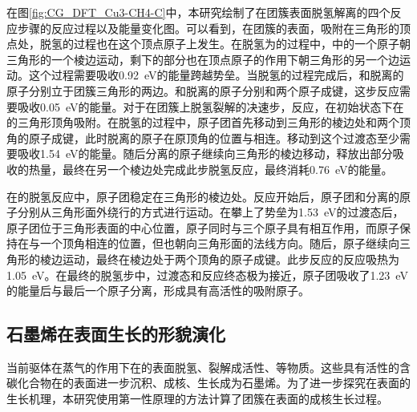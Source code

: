     在图\ref{fig:CG_DFT_Cu3-CH4-C}中，本研究绘制了在团簇表面脱氢解离的四个反应步骤的反应过程以及能量变化图。可以看到，在团簇的表面，吸附在三角形的顶点处，脱氢的过程也在这个顶点原子上发生。在脱氢为的过程中，中的一个原子朝三角形的一个棱边运动，剩下的部分也在顶点原子的作用下朝三角形的另一个边运动。这个过程需要吸收\SI{0.92}{\electronvolt}的能量跨越势垒。当脱氢的过程完成后，和脱离的原子分别立于团簇三角形的两边。和脱离的原子分别和两个原子成键，这步反应需要吸收\SI{0.05}{\electronvolt}的能量。对于在团簇上脱氢裂解的决速步，反应，在初始状态下在的三角形顶角吸附。在脱氢的过程中，原子团首先移动到三角形的棱边处和两个顶角的原子成键，此时脱离的原子在原顶角的位置与相连。移动到这个过渡态至少需要吸收\SI{1.54}{\electronvolt}的能量。随后分离的原子继续向三角形的棱边移动，释放出部分吸收的热量，最终在另一个棱边处完成此步脱氢反应，最终消耗\SI{0.76}{\electronvolt}的能量。
    
    在的脱氢反应中，原子团稳定在三角形的棱边处。反应开始后，原子团和分离的原子分别从三角形面外绕行的方式进行运动。在攀上了势垒为\SI{1.53}{\electronvolt}的过渡态后，原子团位于三角形表面的中心位置，原子同时与三个原子具有相互作用，而原子保持在与一个顶角相连的位置，但也朝向三角形面的法线方向。随后，原子继续向三角形的棱边运动，最终在棱边处于两个顶角的原子成键。此步反应的反应吸热为\SI{1.05}{\electronvolt}。在最终的脱氢步中，过渡态和反应终态极为接近，原子团吸收了\SI{1.23}{\electronvolt}的能量后与最后一个原子分离，形成具有高活性的吸附原子。
    
    \subsection{石墨烯在表面生长的形貌演化}
    
    当前驱体在蒸气的作用下在的表面脱氢、裂解成活性、等物质。这些具有活性的含碳化合物在的表面进一步沉积、成核、生长成为石墨烯。为了进一步探究在表面的生长机理，本研究使用第一性原理的方法计算了团簇在表面的成核生长过程。
    
